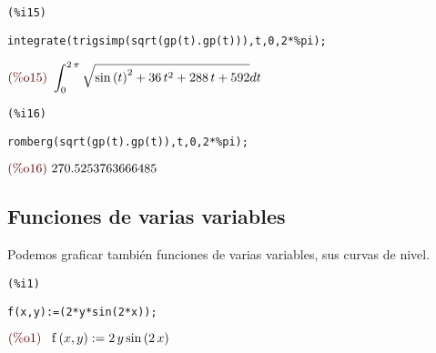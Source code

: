 \documentclass[12pt]{article}
\begin{document}
\noindent
\begin{minipage}[t]{8ex}{\color{red}\bf
\begin{verbatim}
(%i15) 
\end{verbatim}}
\end{minipage}
\begin{minipage}[t]{\textwidth}{\color{blue}
\begin{verbatim}
integrate(trigsimp(sqrt(gp(t).gp(t))),t,0,2*%pi);
\end{verbatim}}
\end{minipage}
\begin{math}\displaystyle
\parbox{8ex}{\color{labelcolor}(\%o15) }
\int_{0}^{2\,\pi }\sqrt{{\mathrm{sin}\left( t\right) }^{2}+36\,{t}^{2}+288\,t+592}dt
\end{math}


\noindent
\begin{minipage}[t]{8ex}{\color{red}\bf
\begin{verbatim}
(%i16) 
\end{verbatim}}
\end{minipage}
\begin{minipage}[t]{\textwidth}{\color{blue}
\begin{verbatim}
romberg(sqrt(gp(t).gp(t)),t,0,2*%pi);
\end{verbatim}}
\end{minipage}
\begin{math}\displaystyle
\parbox{8ex}{\color{labelcolor}(\%o16) }
270.5253763666485
\end{math}

\pagebreak

\subsection{Funciones de varias variables} Podemos graficar también funciones de varias variables, sus curvas de nivel.

\noindent
\begin{minipage}[t]{8ex}{\color{red}\bf
\begin{verbatim}
(%i1) 
\end{verbatim}}
\end{minipage}
\begin{minipage}[t]{\textwidth}{\color{blue}
\begin{verbatim}
f(x,y):=(2*y*sin(2*x));
\end{verbatim}}
\end{minipage}
\begin{math}\displaystyle
\parbox{8ex}{\color{labelcolor}(\%o1) }
\mathrm{f}\left( x,y\right) :=2\,y\,\mathrm{sin}\left( 2\,x\right) 
\end{math}
\end{document}

